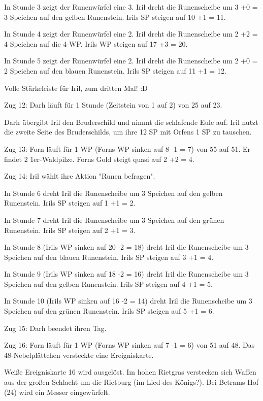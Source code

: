 \documentclass[10pt, a4paper, oneside]{book}
\begin{document}
{In Stunde 3 zeigt der Runenwürfel eine 3. Iril dreht die Runenscheibe um 3 +0 = 3 Speichen auf den gelben Runenstein. Irils SP steigen auf 10 +1 = 11.

In Stunde 4 zeigt der Runenwürfel eine 2. Iril dreht die Runenscheibe um 2 +2 = 4 Speichen auf die 4-WP. Irils WP steigen auf 17 +3 = 20.

In Stunde 5 zeigt der Runenwürfel eine 2. Iril dreht die Runenscheibe um 2 +0 = 2 Speichen auf den blauen Runenstein. Irils SP steigen auf 11 +1 = 12.

Volle Stärkeleiste für Iril, zum dritten Mal! :D



Zug 12: Darh läuft für 1 Stunde (Zeitstein von 1 auf 2) von 25 auf 23.

Darh übergibt Iril den Bruderschild und nimmt die schlafende Eule auf. Iril nutzt die zweite Seite des Bruderschilds, um ihre 12 SP mit Orfens 1 SP zu tauschen.



Zug 13: Forn läuft für 1 WP (Forns WP sinken auf 8 -1 = 7) von 55 auf 51. Er findet 2 1er-Waldpilze. Forns Gold steigt quasi auf 2 +2 = 4.



Zug 14: Iril wählt ihre Aktion "Runen befragen".

In Stunde 6 dreht Iril die Runenscheibe um 3 Speichen auf den gelben Runenstein. Irils SP steigen auf 1 +1 = 2.

In Stunde 7 dreht Iril die Runenscheibe um 3 Speichen auf den grünen Runenstein. Irils SP steigen auf 2 +1 = 3.

In Stunde 8 (Irils WP sinken auf 20 -2 = 18) dreht Iril die Runenscheibe um 3 Speichen auf den blauen Runenstein. Irils SP steigen auf 3 +1 = 4.

In Stunde 9 (Irils WP sinken auf 18 -2 = 16) dreht Iril die Runenscheibe um 3 Speichen auf den gelben Runenstein. Irils SP steigen auf 4 +1 = 5.

In Stunde 10 (Irils WP sinken auf 16 -2 = 14) dreht Iril die Runenscheibe um 3 Speichen auf den grünen Runenstein. Irils SP steigen auf 5 +1 = 6.



Zug 15: Darh beendet ihren Tag.



Zug 16: Forn läuft für 1 WP (Forns WP sinken auf 7 -1 = 6) von 51 auf 48. Das 48-Nebelplättchen versteckte eine Ereigniskarte.

Weiße Ereigniskarte 16 wird ausgelöst. Im hohen Rietgras verstecken sich Waffen aus der großen Schlacht um die Rietburg (im Lied des Königs?). Bei Betrams Hof (24) wird ein Messer eingewürfelt.



}
\end{document}
